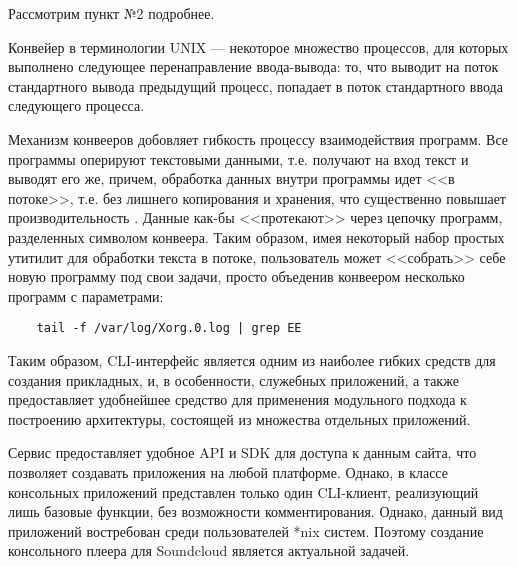Рассмотрим пункт №2 подробнее.

Конвейер в терминологии UNIX — некоторое множество процессов, для
которых выполнено следующее перенаправление ввода-вывода: то, что
выводит на поток стандартного вывода предыдущий процесс, попадает в
поток стандартного ввода следующего процесса.

Механизм конвееров добовляет гибкость процессу взаимодействия программ.
Все программы оперируют текстовыми данными, т.е. получают на вход текст и
выводят его же, причем, обработка данных внутри программы идет <<в
потоке>>, т.е. без лишнего копирования и хранения, что существенно
повышает производительность \cite{habr:gulp}. Данные как-бы <<протекают>>  через
цепочку программ, разделенных символом конвеера. Таким образом, имея
некоторый набор простых утитилит для обработки текста в потоке,
пользователь может <<собрать>> себе новую программу под свои задачи,
просто объеденив конвеером несколько программ с параметрами: 

\begin{lstlisting}
    tail -f /var/log/Xorg.0.log | grep EE
\end{lstlisting}

Таким образом, CLI-интерфейс является одним из наиболее гибких средств для
создания прикладных, и, в особенности, служебных приложений, а также предоставляет
удобнейшее средство для применения модульного подхода к построению
архитектуры, состоящей из множества отдельных приложений.

Сервис предоставляет удобное API и SDK для доступа к данным сайта, что
позволяет создавать приложения на любой платформе. Однако, в классе
консольных приложений представлен только один CLI-клиент, реализующий
лишь базовые функции, без возможности комментирования. Однако,  данный
вид приложений востребован среди пользователей *nix систем. Поэтому
создание консольного плеера для Soundcloud является актуальной
задачей. 

